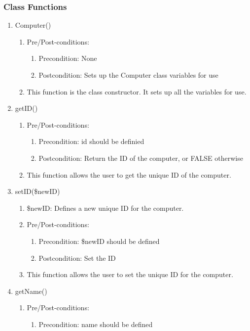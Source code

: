 \documentclass{article}
\begin{document}
\subsubsection{Class Functions}
\begin{enumerate}
\item Computer()
\begin{enumerate}
\item Pre/Post-conditions:
\begin{enumerate}
\item Precondition: None
\item Postcondition: Sets up the Computer class variables for use
\end{enumerate}
\item This function is the class constructor. It sets up all the variables for use.
\end{enumerate}
\item getID()
\begin{enumerate}
\item Pre/Post-conditions:
\begin{enumerate}
\item Precondition: id should be definied
\item Postcondition: Return the ID of the computer, or FALSE otherwise
\end{enumerate}
\item This function allows the user to get the unique ID of the computer.
\end{enumerate}
\item setID(\$newID)
\begin{enumerate}
\item \$newID: Defines a new unique ID for the computer.
\item Pre/Post-conditions:
\begin{enumerate}
\item Precondition: \$newID should be defined
\item Postcondition: Set the ID
\end{enumerate}
\item This function allows the user to set the unique ID for the computer.
\end{enumerate}
\item getName()
\begin{enumerate}
\item Pre/Post-conditions:
\begin{enumerate}
\item Precondition: name should be defined

\end{enumerate}
\end{enumerate}
\end{enumerate}
\end{document}
